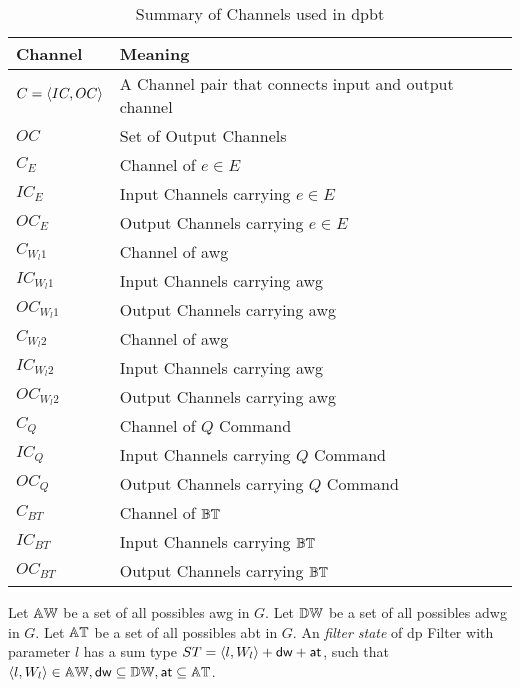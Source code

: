 \begin{table}[ht!]
\centering
\begin{tabular}{|p{0.2\linewidth}|p{0.8\linewidth}|} \hline
\textbf{Channel} & \textbf{Meaning}\\ \hline
$C = \left\langle IC, OC \right\rangle$ & A Channel pair that connects input and output channel\\ \hline
$OC$ & Set of Output Channels \\ \hline
$C_E$ & Channel of $e \in E$ \\ \hline
$IC_E$ & Input Channels carrying $e \in E$ \\ \hline
$OC_E$ & Output Channels carrying $e \in E$ \\ \hline
$C_{W_l1}$ & Channel of \acrshort{awg} \\ \hline
$IC_{W_l1}$ & Input Channels carrying \acrshort{awg} \\ \hline
$OC_{W_l1}$ & Output Channels carrying \acrshort{awg} \\ \hline
$C_{W_l2}$ & Channel of \acrshort{awg} \\ \hline
$IC_{W_l2}$ & Input Channels carrying \acrshort{awg} \\ \hline
$OC_{W_l2}$ & Output Channels carrying \acrshort{awg} \\ \hline
$C_Q$ & Channel of $Q$ Command \\ \hline
$IC_Q$ & Input Channels carrying $Q$ Command \\ \hline
$OC_Q$ & Output Channels carrying $Q$ Command \\ \hline
$C_{BT}$ & Channel of $\mathbb{BT}$ \\ \hline
$IC_{BT}$ & Input Channels carrying $\mathbb{BT}$ \\ \hline
$OC_{BT}$ & Output Channels carrying $\mathbb{BT}$ \\ \hline
\end{tabular}
\caption{Summary of Channels used in \acrshort{dpbt}}
\label{table:channels}
\end{table}

\begin{definition}
Let $\mathbb{AW}$ be a set of all possibles \acrlong{awg} in $G$.
Let $\mathbb{DW}$ be a set of all possibles \acrlong{adwg} in $G$.
Let $\mathbb{AT}$ be a set of all possibles \acrlong{abt} in $G$.
An \textit{filter state} of \acrshort{dp} Filter with parameter $l$ has a sum type $ST = \left\langle l, W_l \right\rangle + \mathsf{dw} + \mathsf{at}$, such that $\left\langle l, W_l \right\rangle \in \mathbb{AW}, \mathsf{dw} \subseteq \mathbb{DW}, \mathsf{at} \subseteq \mathbb{AT}$.
\end{definition}
 
